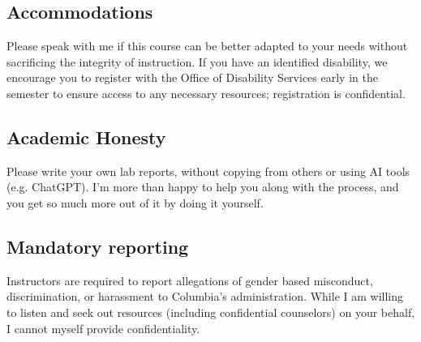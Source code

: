 \documentclass[11pt]{article}
\begin{document}
\subsection*{Accommodations}
Please speak with me if this course can be better adapted to your needs without sacrificing the integrity of instruction. If you have an identified disability, we encourage you to register with the Office of Disability Services early in the semester to ensure access to any necessary resources; registration is confidential.

\subsection*{Academic Honesty}
Please write your own lab reports, without copying from others or using AI tools (e.g. ChatGPT). I'm more than happy to help you along with the process, and you get so much more out of it by doing it yourself.
 
\subsection*{Mandatory reporting}
Instructors are required to report allegations of gender based misconduct, discrimination, or harassment to Columbia's administration. While I am willing to listen and seek out resources (including confidential counselors) on your behalf, I cannot myself provide confidentiality.
\end{document}
